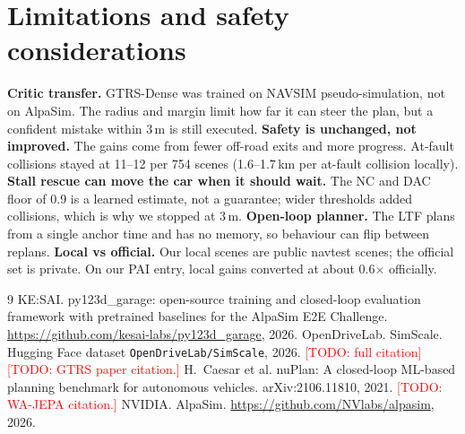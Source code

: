 \documentclass{article}
\newcommand{\todo}[1]{\textcolor{red}{[TODO: #1]}}
\begin{document}
\section{Limitations and safety considerations}
\textbf{Critic transfer.} GTRS-Dense was trained on NAVSIM pseudo-simulation, not on AlpaSim. The radius and margin
limit how far it can steer the plan, but a confident mistake within 3\,m is still executed. \textbf{Safety is
unchanged, not improved.} The gains come from fewer off-road exits and more progress. At-fault collisions stayed at
11--12 per 754 scenes (1.6--1.7\,km per at-fault collision locally). \textbf{Stall rescue can move the car when it
should wait.} The NC and DAC floor of 0.9 is a learned estimate, not a guarantee; wider thresholds added collisions,
which is why we stopped at 3\,m. \textbf{Open-loop planner.} The LTF plans from a single anchor time and has no
memory, so behaviour can flip between replans. \textbf{Local vs official.} Our local scenes are public navtest scenes;
the official set is private. On our PAI entry, local gains converted at about 0.6$\times$ officially.

\begin{thebibliography}{9}
 KE:SAI. \newblock py123d\_garage: open-source training and closed-loop evaluation framework with
  pretrained baselines for the AlpaSim E2E Challenge. \newblock \url{https://github.com/kesai-labs/py123d_garage}, 2026.
 OpenDriveLab. \newblock SimScale. \newblock Hugging Face dataset \texttt{OpenDriveLab/SimScale}, 2026.
  \todo{full citation}
 \todo{GTRS paper citation.}
 H.~Caesar et al. \newblock nuPlan: A closed-loop ML-based planning benchmark for autonomous vehicles.
  \newblock arXiv:2106.11810, 2021.
 \todo{WA-JEPA citation.}
 NVIDIA. \newblock AlpaSim. \newblock \url{https://github.com/NVlabs/alpasim}, 2026.
\end{thebibliography}
\end{document}
